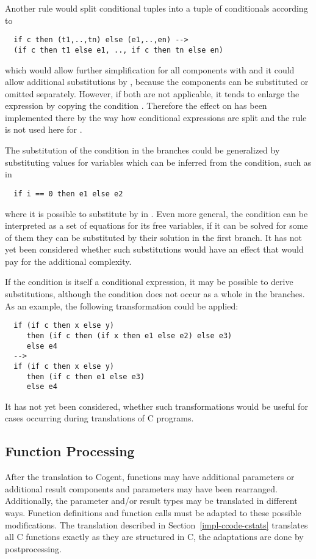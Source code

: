 Another rule would split conditional tuples into a tuple of conditionals according to
\begin{verbatim}
  if c then (t1,..,tn) else (e1,..,en) --> 
  (if c then t1 else e1, .., if c then tn else en)
\end{verbatim}
which would allow further simplification for all components with  and it could allow additional substitutions
by , because the components can be substituted or omitted separately. However, if both are not applicable, it 
tends to enlarge the expression by copying the condition . Therefore the effect on  has been implemented
there by the way how conditional expressions are split and the rule is not used here for .

The substitution of the condition in the branches could be generalized by substituting values for variables which can be
inferred from the condition, such as in
\begin{verbatim}
  if i == 0 then e1 else e2
\end{verbatim}
where it is possible to substitute  by  in . Even more general, the condition can be interpreted as
a set of equations for its free variables, if it can be solved for some of them they can be substituted by their solution
in the first branch. It has not yet been considered whether such substitutions would have an effect that would pay for the 
additional complexity.

If the condition is itself a conditional expression, it may be possible to derive substitutions, although the condition does
not occur as a whole in the branches. As an example, the following transformation could be applied:
\begin{verbatim}
  if (if c then x else y) 
     then (if c then (if x then e1 else e2) else e3) 
     else e4 
  -->
  if (if c then x else y) 
     then (if c then e1 else e3)
     else e4
\end{verbatim}
It has not yet been considered, whether such transformations would be useful for cases occurring during translations of C programs.

\subsection{Function Processing}
\label{impl-post-function}

After the translation to Cogent, functions may have additional parameters or additional result components and parameters may have
been rearranged. Additionally, the parameter and/or result types may be translated in different ways. Function definitions and
function calls must be adapted to these possible modifications. The translation described in Section~\ref{impl-ccode-cstats} 
translates all C functions exactly as they are structured in C, the adaptations are done by postprocessing.

